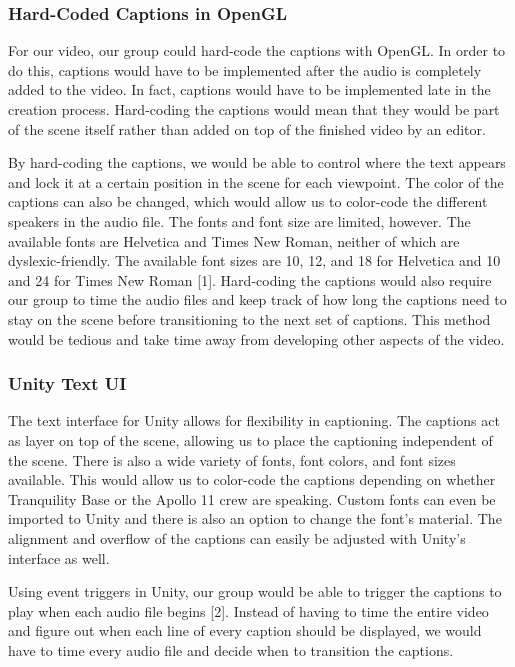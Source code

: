 \documentclass[onecolumn, draftclsnofoot,10pt, compsoc]{IEEEtran}
\begin{document}
\subsubsection{Hard-Coded Captions in OpenGL}
For our video,  our group could hard-code the captions with OpenGL. In order to do this, captions would have to be implemented after the audio is completely added to the video. In fact, captions would have to be implemented late in the creation process. Hard-coding the captions would mean that they would be part of the scene itself rather than added on top of the finished video by an editor.

By hard-coding the captions, we would be able to control where the text appears and lock it at a certain position in the scene for each viewpoint. The color of the captions can also be changed, which would allow us to color-code the different speakers in the audio file. The fonts and font size are limited, however. The available fonts are Helvetica and Times New Roman, neither of which are dyslexic-friendly. The available font sizes are 10, 12, and 18 for Helvetica and 10 and 24 for Times New Roman [1]. Hard-coding the captions would also require our group to time the audio files and keep track of how long the captions need to stay on the scene before transitioning to the next set of captions. This method would be tedious and take time away from developing other aspects of the video.

\subsubsection{Unity Text UI}
The text interface for Unity allows for flexibility in captioning. The captions act as layer on top of the scene, allowing us to place the captioning independent of the scene. There is also a wide variety of fonts, font colors, and font sizes available. This would allow us to color-code the captions depending on whether Tranquility Base or the Apollo 11 crew are speaking. Custom fonts can even be imported to Unity and there is also an option to change the font's material. The alignment and overflow of the captions can easily be adjusted with Unity's interface as well. 

Using event triggers in Unity, our group would be able to trigger the captions to play when each audio file begins [2]. Instead of having to time the entire video and figure out when each line of every caption should be displayed, we would have to time every audio file and decide when to transition the captions.
\end{document}
